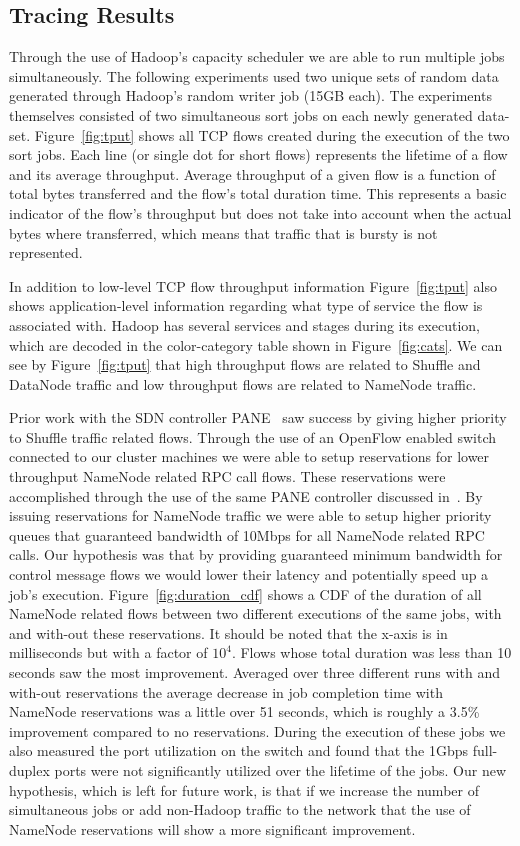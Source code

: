\subsection{Tracing Results}
\label{ssec:results}
Through the use of Hadoop's capacity scheduler we are able to run multiple jobs 
simultaneously. The following experiments used two unique sets of random data generated through 
Hadoop's random writer job (15GB each). The experiments themselves
consisted of two simultaneous sort jobs on each newly generated data-set. Figure~\ref{fig:tput} 
shows all TCP flows created during the execution of the two sort jobs. Each line (or single dot
for short flows) represents the lifetime of a flow and its average throughput. Average throughput 
of a given flow is a function of total bytes transferred and the flow's total duration time.
This represents a basic indicator of the flow's throughput but does not take into account 
when the actual bytes where transferred, which means that traffic that is bursty is not
represented.

In addition to low-level TCP flow throughput information Figure~\ref{fig:tput} also shows 
application-level information regarding what type of service the flow is associated with. 
Hadoop has several services and stages during its execution, which are decoded in the 
color-category table shown in Figure~\ref{fig:cats}. We can see by Figure~\ref{fig:tput}
that high throughput flows are related to Shuffle and DataNode traffic and low throughput
flows are related to NameNode traffic.

Prior work with the SDN controller PANE~\cite{PANE} saw success by giving higher 
priority to Shuffle traffic related flows. Through the use of an OpenFlow enabled switch 
connected to our cluster machines we were able to setup reservations for lower throughput 
NameNode related RPC call flows. These reservations were accomplished through 
the use of the same PANE controller discussed in~\cite{PANE}. By issuing reservations 
for NameNode traffic we were able to setup higher priority queues that guaranteed 
bandwidth of 10Mbps for all NameNode related RPC calls. Our hypothesis was that by providing 
guaranteed minimum bandwidth for control message flows we would lower their
latency and potentially speed up a job's execution. Figure~\ref{fig:duration_cdf}
shows a CDF of the duration of all NameNode related flows between two different
executions of the same jobs, with and with-out these reservations. It should be
noted that the x-axis is in milliseconds but with a factor of $10^4$. Flows whose
total duration was less than 10 seconds saw the most improvement. Averaged over three
different runs with and with-out reservations the average decrease in job 
completion time with NameNode reservations was a little over 51 seconds, which is
roughly a 3.5\% improvement compared to no reservations. During the execution of 
these jobs we also measured the port utilization on the switch and found that 
the 1Gbps full-duplex ports were not significantly utilized over the lifetime 
of the jobs. Our new hypothesis, which is left for future work, is that if we increase 
the number of simultaneous jobs or add non-Hadoop traffic to the network that the use 
of NameNode reservations will show a more significant improvement. 

